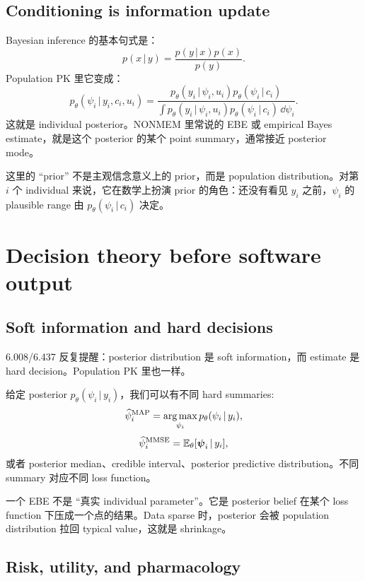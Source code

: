 \documentclass[a4paper]{article}
\DeclareMathOperator*{\argmax}{arg\,max}
\newcommand{\rpsi}{\boldsymbol{\psi}}
\newcommand{\given}{\,|\,}
\newcommand{\E}{\mathbb{E}}
\begin{document}
\subsection{Conditioning is information update}

Bayesian inference 的基本句式是：
\[
  p(x\given y)
  =
  \frac{p(y\given x)p(x)}{p(y)}.
\]
Population PK 里它变成：
\[
  p_\theta(\psi_i\given y_i,c_i,u_i)
  =
  \frac{
    p_\theta(y_i\given \psi_i,u_i)p_\theta(\psi_i\given c_i)
  }{
    \int p_\theta(y_i\given \psi_i,u_i)p_\theta(\psi_i\given c_i)\,\dd\psi_i
  }.
\]
这就是 individual posterior。NONMEM 里常说的 EBE 或 empirical Bayes estimate，就是这个 posterior 的某个 point summary，通常接近 posterior mode。

\begin{remark}
  这里的 ``prior'' 不是主观信念意义上的 prior，而是 population distribution。对第 \(i\) 个 individual 来说，它在数学上扮演 prior 的角色：还没有看见 \(y_i\) 之前，\(\psi_i\) 的 plausible range 由 \(p_\theta(\psi_i\given c_i)\) 决定。
\end{remark}

\section{Decision theory before software output}

\subsection{Soft information and hard decisions}

6.008/6.437 反复提醒：posterior distribution 是 soft information，而 estimate 是 hard decision。Population PK 里也一样。

给定 posterior \(p_\theta(\psi_i\given y_i)\)，我们可以有不同 hard summaries:
\[
  \widehat{\psi}^{\pklab{MAP}}_i
  =
  \argmax_{\psi_i}
  p_\theta(\psi_i\given y_i),
\]
\[
  \widehat{\psi}^{\pklab{MMSE}}_i
  =
  \E_\theta[\rpsi_i\given y_i],
\]
或者 posterior median、credible interval、posterior predictive distribution。不同 summary 对应不同 loss function。

\begin{warning}
  一个 EBE 不是 ``真实 individual parameter''。它是 posterior belief 在某个 loss function 下压成一个点的结果。Data sparse 时，posterior 会被 population distribution 拉回 typical value，这就是 shrinkage。
\end{warning}

\subsection{Risk, utility, and pharmacology}
\end{document}
